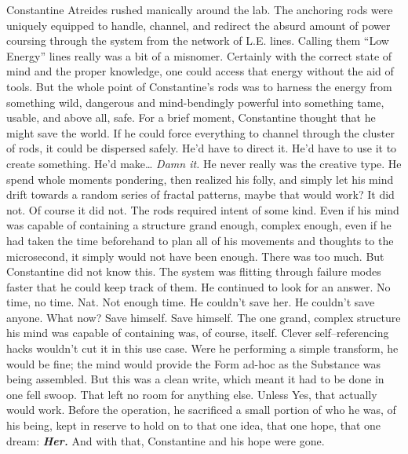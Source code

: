 Constantine Atreides rushed manically around the lab. The anchoring rods were uniquely equipped to handle, channel, and redirect the absurd amount of power coursing through the system from the network of L.E. lines. Calling them “Low Energy” lines really was a bit of a misnomer. Certainly with the correct state of mind and the proper knowledge, one could access that energy without the aid of tools. But the whole point of Constantine’s rods was to harness the energy from something wild, dangerous and mind-bendingly powerful into something tame, usable, and above all, safe.
\SmallVSpace
For a brief moment, Constantine thought that he might save the world. If he could force everything to channel through the cluster of rods, it could be dispersed safely. He’d have to direct it. He’d have to use it to create something. He’d make…
\SmallVSpace
\emph{Damn it.}
\SmallVSpace
He never really was the creative type. He spend whole moments pondering, then realized his folly, and simply let his mind drift towards a random series of fractal patterns, maybe that would work?
\SomeVSpace
It did not.
\SomeVSpace
Of course it did not. The rods required intent of some kind.
\SomeVSpace
Even if his mind was capable of containing a structure grand enough, complex enough, even if he had taken the time beforehand to plan all of his movements and thoughts to the microsecond, it simply would not have been enough. There was too much. But Constantine did not know this. The system was flitting through failure modes faster that he could keep track of them. He continued to look for an answer. No time, no time.
\SomeVSpace
Nat.
\SomeVSpace
Not enough time. He couldn’t save her. He couldn’t save anyone. What now? Save himself. Save himself. The one grand, complex structure his mind was capable of containing was, of course, itself. Clever self\mbox{--}referencing hacks wouldn’t cut it in this use case. Were he performing a simple transform, he would be fine; the mind would provide the Form ad-hoc as the Substance was being assembled.
\SmallVSpace
But this was a clean write, which meant it had to be done in one fell swoop. That left no room for anything else. Unless{\el} Yes, that actually would work. Before the operation, he sacrificed a small portion of who he was, of his being, kept in reserve to hold on to that one idea, that one hope, that one dream:
\SmallVSpace
\textbf{\emph{Her.}}
\SomeVSpace
And with that, Constantine and his hope were gone.
\simpleline
{}

